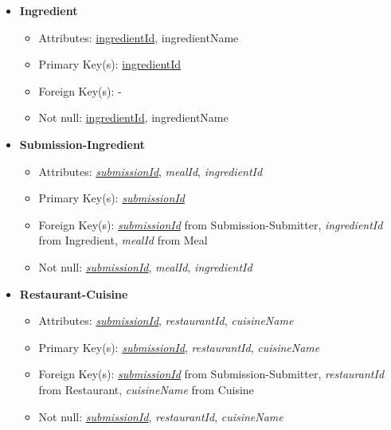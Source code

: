 \documentclass{article}
\begin{document}
\begin{itemize}
        \item \textbf{Ingredient}
        \begin{itemize}
            \item Attributes: \underline{ingredientId}, ingredientName
            \item Primary Key(s): \underline{ingredientId}
            \item Foreign Key(s): -
            \item Not null: \underline{ingredientId}, ingredientName
        \end{itemize}

        \item \textbf{Submission-Ingredient}
        \begin{itemize}            
            \item Attributes: \underline{\textit{submissionId}}, \textit{mealId}, \textit{ingredientId}
            \item Primary Key(s): \underline{\textit{submissionId}}
            \item Foreign Key(s): \underline{\textit{submissionId}} from Submission-Submitter, \textit{ingredientId} from Ingredient, \textit{mealId} from Meal
            \item Not null: \underline{\textit{submissionId}}, \textit{mealId}, \textit{ingredientId}
        \end{itemize}

        \item \textbf{Restaurant-Cuisine}
        \begin{itemize}
            \item Attributes: \underline{\textit{submissionId}}, \textit{restaurantId}, \textit{cuisineName}
            \item Primary Key(s): \underline{\textit{submissionId}}, \textit{restaurantId}, \textit{cuisineName}
            \item Foreign Key(s): \underline{\textit{submissionId}} from Submission-Submitter, \textit{restaurantId} from Restaurant, \textit{cuisineName} from Cuisine
            \item Not null: \underline{\textit{submissionId}}, \textit{restaurantId}, \textit{cuisineName}
        \end{itemize}

    \end{itemize}
    
\end{document}
